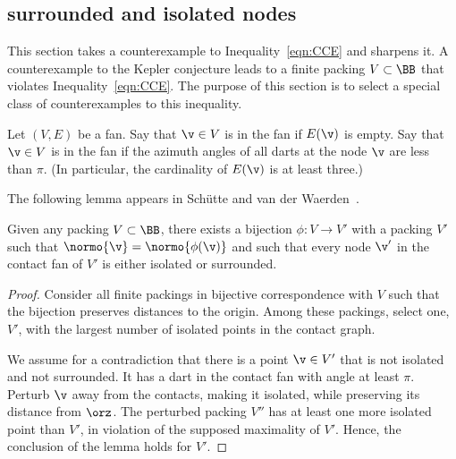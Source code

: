 \subsection{surrounded and isolated nodes}

This section takes a counterexample to Inequality~\ref{eqn:CCE} and  sharpens it.
%
A counterexample to the Kepler conjecture leads to a finite packing
$V\subset \BB$ that violates Inequality~\ref{eqn:CCE}.  The
purpose of this section is to select a special class of
counterexamples to this inequality. 

\begin{definition}
  Let $(V,E)$ be a fan.  Say that $\v\in V$ is  in
  the fan if $E(\v)$ is empty.  Say that $\v\in V$ is
   in the fan if the azimuth angles of all darts
  at the node $\v$ are less than $\pi$.  (In particular, the
  cardinality of $E(\v)$ is at least three.)
\end{definition}
%
%
%
%
%
%

The following lemma appears in Sch\"utte and van der
Waerden~\cite{vanderWaerden:1951}.

\begin{lemma*}[]
\label{lemma:iso-surround}
Given any packing $V\subset \BB$,
there exists a bijection $\phi:V\to V'$ with a  packing $V'$ 
such that $\normo{\v} = \normo{\phi(\v)}$ and
such that every node $\v'$ in the contact fan of $V'$
is either isolated or surrounded.
\end{lemma*}
%
%
%

\begin{proof} Consider all finite packings in bijective correspondence
  with $V$ such that the bijection preserves distances to
  the origin.  Among these packings, select one, $V'$, with the largest
  number of isolated points in the contact graph.  

We assume for a contradiction that  there is a point
  $\v\in V'$ that is not isolated and not surrounded.  It  has a
  dart in the contact fan with angle at least $\pi$.  Perturb $\v$ away from the
  contacts, making it isolated, while preserving its distance from
  $\orz$.  The perturbed packing $V''$ has at least one more isolated point
  than $V'$, in violation of the supposed maximality of $V'$.
  Hence, the conclusion of the lemma holds for $V'$.
\end{proof}

